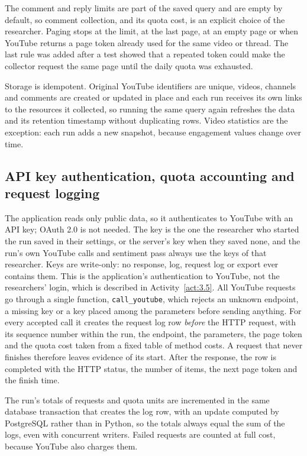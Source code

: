 The comment and reply limits are part of the saved query and are empty by default, so comment collection, and its quota cost, is an explicit choice of the researcher. Paging stops at the limit, at the last page, at an empty page or when YouTube returns a page token already used for the same video or thread. The last rule was added after a test showed that a repeated token could make the collector request the same page until the daily quota was exhausted.

Storage is idempotent. Original YouTube identifiers are unique, videos, channels and comments are created or updated in place and each run receives its own links to the resources it collected, so running the same query again refreshes the data and its retention timestamp without duplicating rows. Video statistics are the exception: each run adds a new snapshot, because engagement values change over time.

\subsection{API key authentication, quota accounting and request logging}

The application reads only public data, so it authenticates to YouTube with an API key; OAuth 2.0 is not needed. The key is the one the researcher who started the run saved in their settings, or the server's key when they saved none, and the run's own YouTube calls and sentiment pass always use the keys of that researcher. Keys are write-only: no response, log, request log or export ever contains them. This is the application's authentication to YouTube, not the researchers' login, which is described in Activity~\ref{act:3.5}. All YouTube requests go through a single function, \texttt{call\_\allowbreak youtube}, which rejects an unknown endpoint, a missing key or a key placed among the parameters before sending anything. For every accepted call it creates the request log row \emph{before} the HTTP request, with its sequence number within the run, the endpoint, the parameters, the page token and the quota cost taken from a fixed table of method costs. A request that never finishes therefore leaves evidence of its start. After the response, the row is completed with the HTTP status, the number of items, the next page token and the finish time.

The run's totals of requests and quota units are incremented in the same database transaction that creates the log row, with an update computed by PostgreSQL rather than in Python, so the totals always equal the sum of the logs, even with concurrent writers. Failed requests are counted at full cost, because YouTube also charges them.


